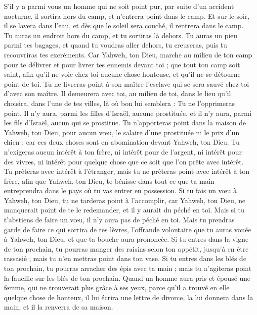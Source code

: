 \begin{multicols}{2}
S'il y a parmi vous un homme qui ne soit point pur, par suite d’un accident nocturne, il sortira hors du camp, et n'entrera point dans le camp.
Et sur le soir, il se lavera dans l’eau, et dès que le soleil sera couché, il rentrera dans le camp.
Tu auras un endroit hors du camp, et tu sortiras là dehors.
Tu auras un pieu parmi tes bagages, et quand tu voudras aller dehors, tu creuseras, puis tu recouvriras tes excréments.
Car Yahweh, ton Dieu, marche au milieu de ton camp pour te délivrer et pour livrer tes ennemis devant toi ; que tout ton camp soit saint, afin qu'il ne voie chez toi aucune chose honteuse, et qu'il ne se détourne point de toi.
Tu ne livreras point à son maître l’esclave qui se sera sauvé chez toi d'avec son maître.
Il demeurera avec toi, au milieu de toi, dans le lieu qu'il choisira, dans l'une de tes villes, là où bon lui semblera : Tu ne l’opprimeras point.
Il n’y aura, parmi les filles d'Israël, aucune prostituée, et il n’y aura, parmi les fils d’Israël, aucun qui se prostitue.
Tu n'apporteras point dans la maison de Yahweh, ton Dieu, pour aucun vœu, le salaire d'une prostituée ni le prix d'un chien ; car ces deux choses sont en abomination devant Yahweh, ton Dieu.
Tu n’exigeras aucun intérêt à ton frère, ni intérêt pour de l’argent, ni intérêt pour des vivres, ni intérêt pour quelque chose que ce soit que l'on prête avec intérêt.
Tu prêteras avec intérêt à l'étranger, mais tu ne prêteras point avec intérêt à ton frère, afin que Yahweh, ton Dieu, te bénisse dans tout ce que ta main entreprendra dans le pays où tu vas entrer en possession.
Si tu fais un vœu à Yahweh, ton Dieu, tu ne tarderas point à l'accomplir, car Yahweh, ton Dieu, ne manquerait point de te le redemander, et il y aurait du péché en toi.
Mais si tu t'abstiens de faire un vœu, il n'y aura pas de péché en toi.
Mais tu prendras garde de faire ce qui sortira de tes lèvres, l’offrande volontaire que tu auras vouée à Yahweh, ton Dieu, et que ta bouche aura prononcée.
Si tu entres dans la vigne de ton prochain, tu pourras manger des raisins selon ton appétit, jusqu'à en être rassasié ; mais tu n'en mettras point dans ton vase.
Si tu entres dans les blés de ton prochain, tu pourras arracher des épis avec ta main ; mais tu n’agiteras point la faucille sur les blés de ton prochain.
\VerseOne{}Quand un homme aura pris et épousé une femme, qui ne trouverait plus grâce à ses yeux, parce qu’il a trouvé en elle quelque chose de honteux, il lui écrira une lettre de divorce, la lui donnera dans la main, et il la renverra de sa maison.

\end{multicols}
